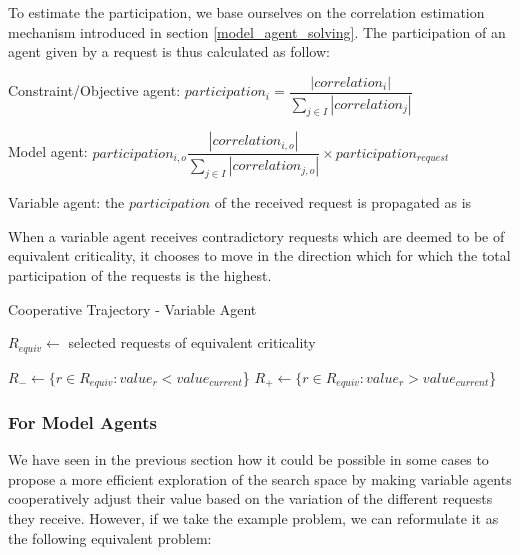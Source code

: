 To estimate the participation, we base ourselves on the correlation estimation mechanism introduced in section \ref{model_agent_solving}. The participation of an agent given by a request is thus calculated as follow:
\begin{compactitem}
\item Constraint/Objective agent: $participation_{i} = \dfrac{| correlation_{i} |}{\displaystyle \sum_{j \in I}{|correlation _{j}|}}$
\item Model agent: $participation_{i,o}\dfrac{| correlation_{i,o} |}{\displaystyle \sum_{j \in I}{|correlation _{j,o}|}} \times participation_{request}$
\item Variable agent: the $participation$ of the received request is propagated as is
\end{compactitem}

When a variable agent receives contradictory requests which are deemed to be of equivalent criticality, it chooses to move in the direction which for which the total participation of the requests is the highest.

\begin{algorithm}
\caption{Cooperative Trajectory - Variable Agent}
\label{algo_cooperative_trajectory_variable}
	$R_{equiv} \leftarrow$ selected requests of equivalent criticality\;
	
		$R_- \leftarrow \{r \in R_{equiv} : value_{r} < value_{current}$\}\;
		$R_+ \leftarrow \{r \in R_{equiv} : value_{r} > value_{current}$\}\;
		
\end{algorithm}

\subsubsection{For Model Agents}

We have seen in the previous section how it could be possible in some cases to propose a more efficient exploration of the search space by making variable agents cooperatively adjust their value based on the variation of the different requests they receive. However, if we take the example problem, we can reformulate it as the following equivalent problem:

